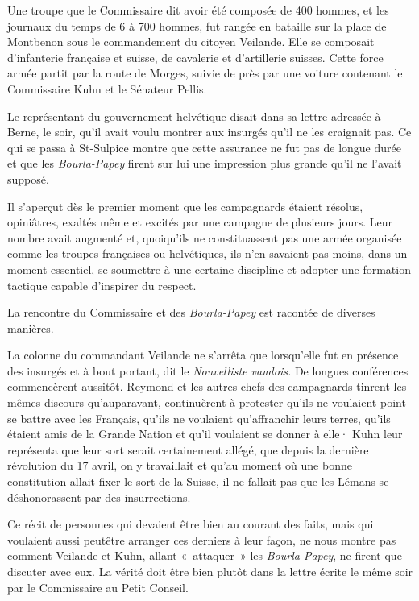 \documentclass[french,twoside]{book} %
\begin{document}
\noindent Une troupe que le Commissaire dit avoir été composée de 400 hommes, et les journaux du temps de 6 à 700 hommes, fut rangée en bataille sur la place de Montbenon sous le commandement du citoyen Veilande. Elle se composait d’infanterie française et suisse, de cavalerie et d’artillerie suisses. Cette force armée partit par la route de Morges, suivie de près par une voiture contenant le Commissaire Kuhn et le Sénateur Pellis.\par
Le représentant du gouvernement helvétique disait dans sa lettre adressée à Berne, le soir, qu’il avait voulu montrer aux insurgés qu’il ne les craignait pas. Ce qui se passa à St-Sulpice montre que cette assurance ne fut pas de longue durée et que les \emph{Bourla-Papey} firent sur lui une impression plus grande qu’il ne l’avait supposé.\par
Il s’aperçut dès le premier moment que les campagnards étaient résolus, opiniâtres, exaltés même et excités par une campagne de plusieurs jours. Leur nombre avait augmenté et, quoiqu’ils ne constituassent pas une armée organisée comme les troupes françaises ou helvétiques, ils n’en savaient pas moins, dans un moment essentiel, se soumettre à une certaine discipline et adopter une formation tactique capable d’inspirer du respect.\par
La rencontre du Commissaire et des \emph{Bourla-Papey} est racontée de diverses manières.\par
La colonne du commandant Veilande ne s’arrêta que lorsqu’elle fut en présence des insurgés et à bout portant, dit le \emph{Nouvelliste vaudois.} De longues conférences commencèrent aussitôt. Reymond et les autres chefs des campagnards tinrent les mêmes discours qu’auparavant, continuèrent à protester qu’ils ne voulaient point se battre avec les Français, qu’ils ne voulaient qu’affranchir leurs terres, qu’ils étaient amis de la Grande Nation et qu’il voulaient se donner à elle· Kuhn leur représenta que leur sort serait certainement allégé, que depuis la dernière révolution du 17 avril, on y travaillait et qu’au moment où une bonne constitution allait fixer le sort de la Suisse, il ne fallait pas que les Lémans se déshonorassent par des insurrections.\par
Ce récit de personnes qui devaient être bien au courant des faits, mais qui voulaient aussi peutêtre arranger ces derniers à leur façon, ne nous montre pas comment Veilande et Kuhn, allant « attaquer » les \emph{Bourla-Papey}, ne firent que discuter avec eux. La vérité doit être bien plutôt dans la lettre écrite le même soir par le Commissaire au Petit Conseil.\par
\end{document}
